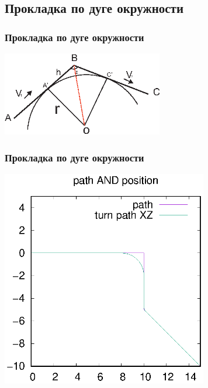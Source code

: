 \documentclass[10pt,t]{beamer}
\begin{document}
\subsection[Прокладка по дуге окружности]{Прокладка по дуге окружности}
\begin{frame}
\frametitle{Прокладка по дуге окружности}
\small

\centering

\includegraphics[width=70mm]{tochki_kasania.eps}

\end{frame}
\begin{frame}
\frametitle{Прокладка по дуге окружности}
\small	

  \centering

  \includegraphics[width=90mm]{default_path_prokladka.eps}

\end{frame}
\end{document}
